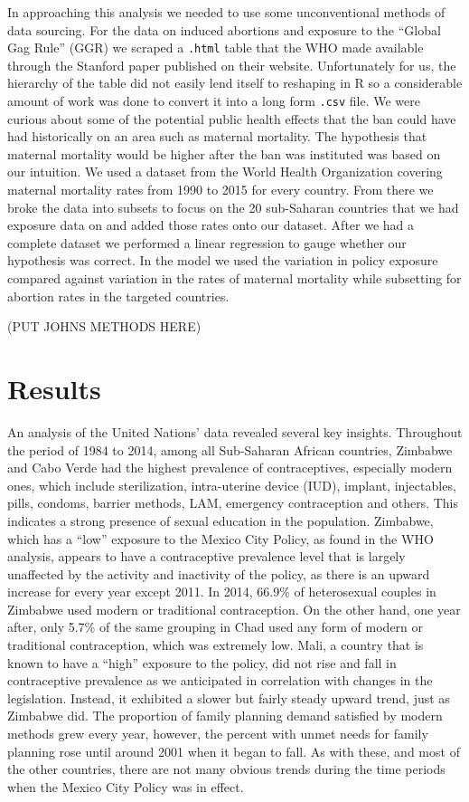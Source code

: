 \documentclass[11pt,]{article}
\begin{document}
In approaching this analysis we needed to use some unconventional
methods of data sourcing. For the data on induced abortions and exposure
to the ``Global Gag Rule'' (GGR) we scraped a \texttt{.html} table that
the WHO made available through the Stanford paper published on their
website. Unfortunately for us, the hierarchy of the table did not easily
lend itself to reshaping in R so a considerable amount of work was done
to convert it into a long form \texttt{.csv} file. We were curious about
some of the potential public health effects that the ban could have had
historically on an area such as maternal mortality. The hypothesis that
maternal mortality would be higher after the ban was instituted was
based on our intuition. We used a dataset from the World Health
Organization covering maternal mortality rates from 1990 to 2015 for
every country. From there we broke the data into subsets to focus on the
20 sub-Saharan countries that we had exposure data on and added those
rates onto our dataset. After we had a complete dataset we performed a
linear regression to gauge whether our hypothesis was correct. In the
model we used the variation in policy exposure compared against
variation in the rates of maternal mortality while subsetting for
abortion rates in the targeted countries.

(PUT JOHNS METHODS HERE)

\section{Results}\label{results}

An analysis of the United Nations' data revealed several key insights.
Throughout the period of 1984 to 2014, among all Sub-Saharan African
countries, Zimbabwe and Cabo Verde had the highest prevalence of
contraceptives, especially modern ones, which include sterilization,
intra-uterine device (IUD), implant, injectables, pills, condoms,
barrier methods, LAM, emergency contraception and others. This indicates
a strong presence of sexual education in the population. Zimbabwe, which
has a ``low'' exposure to the Mexico City Policy, as found in the WHO
analysis, appears to have a contraceptive prevalence level that is
largely unaffected by the activity and inactivity of the policy, as
there is an upward increase for every year except 2011. In 2014, 66.9\%
of heterosexual couples in Zimbabwe used modern or traditional
contraception. On the other hand, one year after, only 5.7\% of the same
grouping in Chad used any form of modern or traditional contraception,
which was extremely low. Mali, a country that is known to have a
``high'' exposure to the policy, did not rise and fall in contraceptive
prevalence as we anticipated in correlation with changes in the
legislation. Instead, it exhibited a slower but fairly steady upward
trend, just as Zimbabwe did. The proportion of family planning demand
satisfied by modern methods grew every year, however, the percent with
unmet needs for family planning rose until around 2001 when it began to
fall. As with these, and most of the other countries, there are not many
obvious trends during the time periods when the Mexico City Policy was
in effect.
\end{document}
